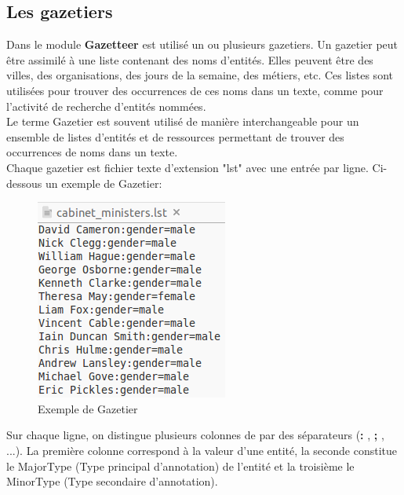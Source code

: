 \documentclass[a4paper, 11pt]{report}
\begin{document}
\subsection{Les gazetiers}
Dans le module \textbf{Gazetteer} est utilisé un ou plusieurs gazetiers. Un gazetier peut être assimilé à une liste contenant des noms d'entités. Elles peuvent être des villes, des organisations, des jours de la semaine, des métiers, etc. Ces listes sont utilisées pour trouver des occurrences de ces noms dans un texte, comme pour l'activité de recherche d'entités nommées.\\
Le terme Gazetier est souvent utilisé de manière interchangeable pour un ensemble de listes d'entités et de ressources permettant de trouver des occurrences de noms dans un texte.\\
Chaque gazetier est fichier texte d'extension "lst" avec une entrée par ligne.\cite{w4}
Ci-dessous un exemple de Gazetier:
\begin{figure}[H]
\begin{center}
\includegraphics[scale=0.5]{img/exGazetier.png}
\end{center}
\caption{Exemple de Gazetier}
\end{figure}
Sur chaque ligne, on distingue plusieurs colonnes de par des séparateurs (\textbf{:} , \textbf{;} , ...). La première colonne correspond à la valeur d'une entité, la seconde constitue le MajorType (Type principal d'annotation) de l'entité et la troisième le MinorType (Type secondaire d'annotation).\cite{w4}
\end{document}
